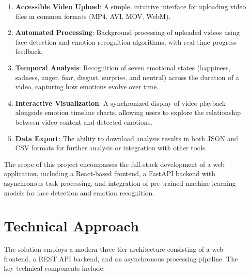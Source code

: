 \begin{enumerate}
    \item \textbf{Accessible Video Upload}: A simple, intuitive interface for uploading video files in common formats (MP4, AVI, MOV, WebM).

    \item \textbf{Automated Processing}: Background processing of uploaded videos using face detection and emotion recognition algorithms, with real-time progress feedback.

    \item \textbf{Temporal Analysis}: Recognition of seven emotional states (happiness, sadness, anger, fear, disgust, surprise, and neutral) across the duration of a video, capturing how emotions evolve over time.

    \item \textbf{Interactive Visualization}: A synchronized display of video playback alongside emotion timeline charts, allowing users to explore the relationship between video content and detected emotions.

    \item \textbf{Data Export}: The ability to download analysis results in both JSON and CSV formats for further analysis or integration with other tools.
\end{enumerate}

The scope of this project encompasses the full-stack development of a web application, including a React-based frontend, a FastAPI backend with asynchronous task processing, and integration of pre-trained machine learning models for face detection and emotion recognition.

\section{Technical Approach}
\label{sec:approach}

The solution employs a modern three-tier architecture consisting of a web frontend, a REST API backend, and an asynchronous processing pipeline. The key technical components include:

